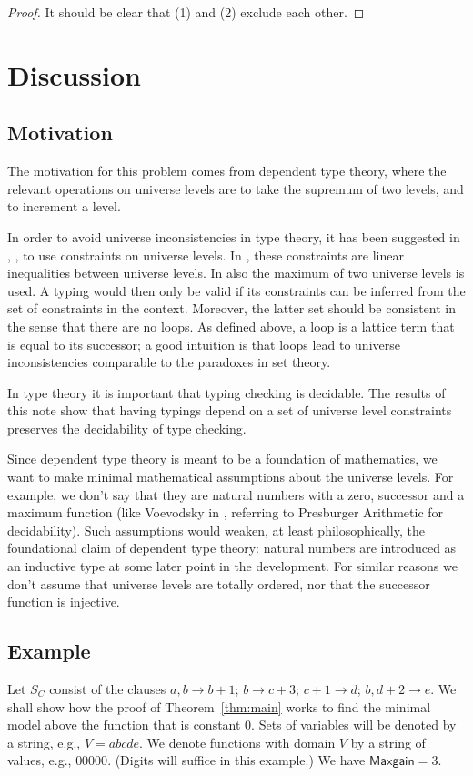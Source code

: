 \documentclass[11pt,a4paper]{article}
\newcommand\M{\mathsf{Maxgain}}
\begin{document}
\begin{proof}
It should be clear that (1) and (2) exclude each other.
\end{proof}


\section{Discussion}

\subsection{Motivation}

The motivation for this problem comes from dependent type theory, 
where the relevant operations on universe levels are to take the
supremum of two levels, and to increment a level.

In order to avoid universe inconsistencies in type theory, 
it has been suggested in \cite{Huet87}, \cite{HarperP91}, \cite{VV}
to use constraints on universe levels.
In \cite{Huet87}, \cite{HarperP91} these constraints
are linear inequalities between universe levels.
In \cite{VV} also the maximum of two universe levels is used.
A typing would then
only be valid if its constraints can be inferred from the set
of constraints in the context. 
Moreover, the latter set should
be consistent in the sense that there are no loops. 
As defined above, a loop is a lattice term that is equal to its successor; 
a good intuition is that loops lead to universe inconsistencies 
comparable to the paradoxes in set theory.

In type theory it is important that typing checking is decidable.
The results of this note show that having typings depend
on a set of universe level constraints preserves the decidability
of type checking.

Since dependent type theory is meant to be a foundation of mathematics,
we want to make minimal mathematical assumptions about the universe levels.
For example, we don't say that they are natural numbers
with a zero, successor and a maximum function (like Voevodsky in \cite{VV},
referring to Presburger Arithmetic for decidability).
Such assumptions would weaken, at least philosophically,
the foundational claim of dependent type theory:
natural numbers are introduced as an inductive type
at some later point in the development. For similar reasons
we don't assume that universe levels are totally ordered,
nor that the successor function is injective.

\subsection{Example}
Let $S_C$ consist of the clauses 
$a,b\to b+1$; $b\to c+3$; $c+1\to d$; $b,d+2\to e$.
We shall show how the proof of Theorem~\ref{thm:main} works to find the 
minimal model above the function that is constant $0$.
Sets of variables will be denoted by a string, e.g., $V=abcde$. 
We denote functions with domain $V$ by a string of values, e.g., $00000$.
(Digits will suffice in this example.) We have $\M=3$.
\end{document}
